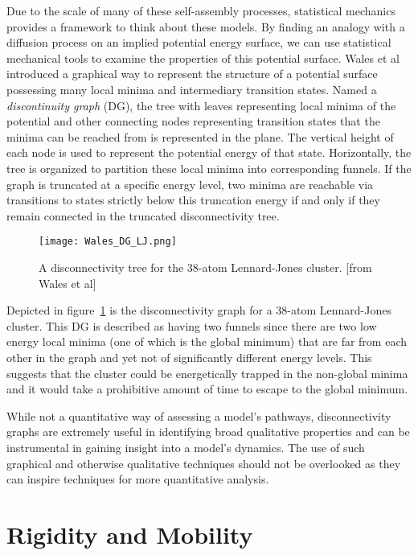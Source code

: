 \documentclass[12pt]{article}
\begin{document}
Due to the scale of many of these self-assembly processes, statistical mechanics provides a framework to think about these models. By finding an analogy with a diffusion process on an implied potential energy surface, we can use statistical mechanical tools to examine the properties of this potential surface. Wales et al introduced a graphical way to represent the structure of a potential surface possessing many local minima and intermediary transition states. Named a \textit{discontinuity graph} (DG), the tree with leaves representing local minima of the potential and other connecting nodes representing transition states that the minima can be reached from is represented in the plane. The vertical height of each node is used to represent the potential energy of that state. Horizontally, the tree is organized to partition these local minima into corresponding funnels. If the graph is truncated at a specific energy level, two minima are reachable via transitions to states strictly below this truncation energy if and only if they remain connected in the truncated disconnectivity tree. 

\begin{figure}[!h]
\centering
\texttt{[image: Wales\_DG\_LJ.png]}
\caption{A disconnectivity tree for the 38-atom Lennard-Jones cluster. [from Wales et al]}
\label{fig:dg}
\end{figure}

Depicted in figure~\ref{fig:dg} is the disconnectivity graph for a 38-atom Lennard-Jones cluster. This DG is described as having two funnels since there are two low energy local minima (one of which is the global minimum) that are far from each other in the graph and yet not of significantly different energy levels. This suggests that the cluster could be energetically trapped in the non-global minima and it would take a prohibitive amount of time to escape to the global minimum. 

While not a quantitative way of assessing a model's pathways, disconnectivity graphs are extremely useful in identifying broad qualitative properties and can be instrumental in gaining insight into a model's dynamics. The use of such graphical and otherwise qualitative techniques should not be overlooked as they can inspire techniques for more quantitative analysis.  

\section{Rigidity and Mobility}
\end{document}
